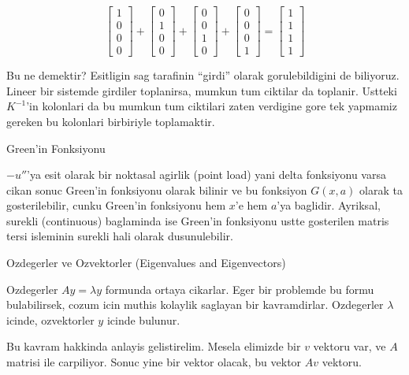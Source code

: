 \documentclass[12pt,fleqn]{article}
\begin{document}
\[ 
\left[\begin{array}{c} 1 \\ 0 \\ 0 \\ 0  \end{array} \right] +
\left[\begin{array}{c} 0 \\ 1 \\ 0 \\ 0  \end{array} \right] +
\left[\begin{array}{c} 0 \\ 0 \\ 1 \\ 0  \end{array} \right] +
\left[\begin{array}{c} 0 \\ 0 \\ 0 \\ 1  \end{array} \right] = 
\left[\begin{array}{c} 1 \\ 1 \\ 1 \\ 1  \end{array} \right] 
 \]

Bu ne demektir? Esitligin sag tarafinin ``girdi'' olarak gorulebildigini de
biliyoruz. Lineer bir sistemde girdiler toplanirsa, mumkun tum ciktilar da
toplanir. Ustteki $K^{-1}$'in kolonlari da bu mumkun tum ciktilari zaten
verdigine gore tek yapmamiz gereken bu kolonlari birbiriyle toplamaktir. 

Green'in Fonksiyonu

$-u''$'ya esit olarak bir noktasal agirlik (point load) yani delta
fonksiyonu varsa cikan sonuc Green'in fonksiyonu olarak bilinir ve
bu fonksiyon $G(x,a)$ olarak ta gosterilebilir, cunku Green'in fonksiyonu hem
$x$'e hem $a$'ya baglidir. Ayriksal, surekli (continuous) baglaminda ise
Green'in fonksiyonu ustte gosterilen matris tersi isleminin surekli hali
olarak dusunulebilir. 

Ozdegerler ve Ozvektorler (Eigenvalues and Eigenvectors)

Ozdegerler $Ay = \lambda y$ formunda ortaya cikarlar. Eger bir problemde bu
formu bulabilirsek, cozum icin muthis kolaylik saglayan bir
kavramdirlar. Ozdegerler $\lambda$ icinde, ozvektorler $y$ icinde bulunur. 

Bu kavram hakkinda anlayis gelistirelim. Mesela elimizde bir $v$ vektoru
var, ve $A$ matrisi ile carpiliyor. Sonuc yine bir vektor olacak, bu vektor
$Av$ vektoru. 
\end{document}

